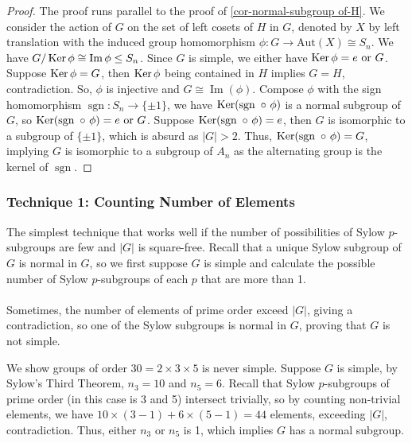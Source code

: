 \begin{proof}
	The proof runs parallel to the proof of \ref{cor-normal-subgroup of-H}. We consider the action of $G$ on the set of left cosets of $H$ in $G$, denoted by $X$ by left translation with the induced group homomorphism $\phi : G \rightarrow \text{Aut}(X) \cong S_{n}$. We have $G/\operatorname{Ker}\phi \cong \operatorname{Im}\phi \leq S_n$. Since $G$ is simple, we either have $\operatorname{Ker}\phi = e \text{~or~} G$. Suppose $\operatorname{Ker}\phi = G$, then $\operatorname{Ker}\phi$ being contained in $H$ implies $G = H$, contradiction. So, $\phi$ is injective and $G \cong \operatorname{Im}(\phi)$. Compose $\phi$ with the sign homomorphism $\operatorname{sgn}: S_{n} \rightarrow \{\pm 1\}$, we have $\operatorname{Ker}(\operatorname{sgn} ~\circ~ \phi)$ is a normal subgroup of $G$, so $\operatorname{Ker}(\operatorname{sgn} ~\circ~ \phi) = e \text{~or~} G$. Suppose $\operatorname{Ker}(\operatorname{sgn} ~\circ~ \phi) = e$, then $G$ is isomorphic to a subgroup of $\{\pm 1\}$, which is absurd as $|G| > 2$. Thus, $\operatorname{Ker}(\operatorname{sgn} ~\circ~ \phi) = G$, implying $G$ is isomorphic to a subgroup of $A_n$ as the alternating group is the kernel of $\operatorname{sgn}$.
\end{proof}

\subsubsection{Technique 1: Counting Number of Elements}
The simplest technique that works well if the number of possibilities of Sylow $p$-subgroups are few and $|G|$ is square-free. Recall that a unique Sylow subgroup of $G$ is normal in $G$, so we first suppose $G$ is simple and calculate the possible number of Sylow $p$-subgroups of each $p$ that are more than 1.
\\\\
Sometimes, the number of elements of prime order exceed $|G|$, giving a contradiction, so one of the Sylow subgroups is normal in $G$, proving that $G$ is not simple.

\begin{example}
	We show groups of order $30 = 2 \times 3 \times 5$ is never simple. Suppose $G$ is simple, by Sylow's Third Theorem, $n_3 = 10$ and $n_5 = 6$. Recall that Sylow $p$-subgroups of prime order (in this case is 3 and 5) intersect trivially, so by counting non-trivial elements, we have $10 \times (3-1) + 6 \times (5-1) = 44$ elements, exceeding $|G|$, contradiction. Thus, either $n_3$ or $n_5$ is 1, which implies $G$ has a normal subgroup. 
\end{example}

